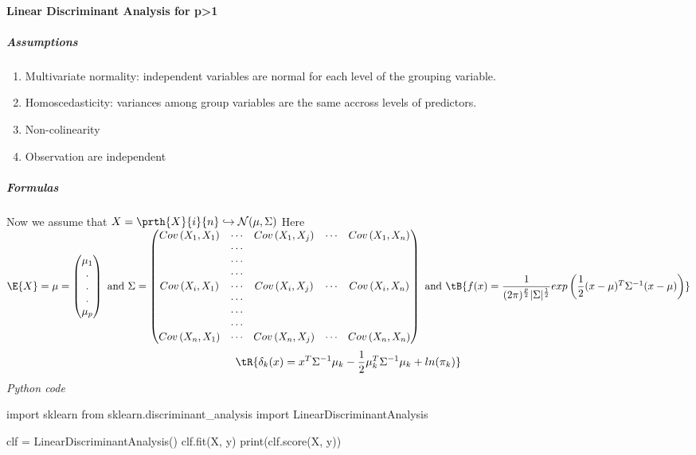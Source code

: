 \paragraph{Linear Discriminant Analysis for p>1}
\subparagraph{Assumptions}
\begin{enumerate}
	\item Multivariate normality: independent variables are normal for each level of the grouping
		variable.
	\item Homoscedasticity: variances among group variables are the same accross levels of 
		predictors.
	\item Non-colinearity
	\item Observation are independent 
\end{enumerate}
\subparagraph{Formulas}
Now we assume that $X=\prth{X}{i}{n}\hookrightarrow\mathcal{N}(\mu,\Sigma)$
Here $\E{X}=\mu = 
\begin{pmatrix}
	\mu_{1}\\
	.\\
	.\\
	.\\
	\mu_{p}
\end{pmatrix}
\text{ and } \Sigma = 
\begin{pmatrix}
	Cov\left( X_{1},X_{1} \right) & \cdots & Cov\left( X_{1},X_{j}\right) &\cdots & Cov\left( X_{1},X_{n} \right)\\
	&\cdots& & &\\
	&\cdots& & &\\
	&\cdots& & &\\
	Cov\left( X_{i},X_{1} \right) & \cdots & Cov\left( X_{i},X_{j}\right) &\cdots & Cov\left( X_{i},X_{n} \right)\\
	&\cdots& & &\\
	&\cdots& & &\\
	&\cdots& & &\\
	Cov\left( X_{n},X_{1} \right) & \cdots & Cov\left( X_{n},X_{j}\right) &\cdots & Cov\left( X_{n},X_{n} \right)\\
\end{pmatrix}\\
\text{ and }
\tB{f(x)=\dfrac{1}{(2\pi)^{\frac{p}{2}}|\Sigma|^{\frac{1}{2}}}exp\left( \dfrac{1}{2}(x-\mu)^{T}\Sigma^{-1}(x-\mu) \right)}
	$\\
$$
\tR{\delta_{k}(x) = x^{T}\Sigma^{-1}\mu_{k}-\dfrac{1}{2}\mu_{k}^{T}\Sigma^{-1}\mu_{k}+ln(\pi_{k})}
$$
\emph{Python code}
\begin{python}
import sklearn
from sklearn.discriminant_analysis import LinearDiscriminantAnalysis

clf = LinearDiscriminantAnalysis()
clf.fit(X, y)
print(clf.score(X, y))
\end{python}

